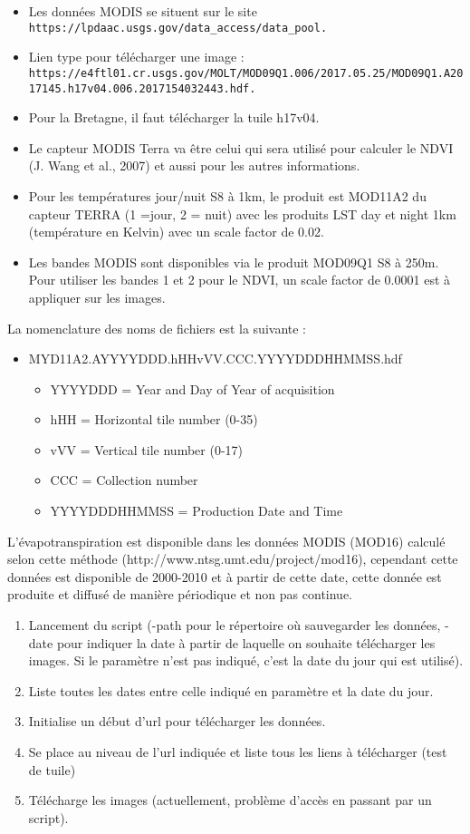 \documentclass[10pt,a4paper]{article}
\begin{document}
\begin{itemize}
\item Les données MODIS se situent sur le site \verb!https://lpdaac.usgs.gov/data_access/data_pool.!
\item Lien type pour télécharger une image : \verb!https://e4ftl01.cr.usgs.gov/MOLT/MOD09Q1.006/2017.05.25/MOD09Q1.A2017145.h17v04.006.2017154032443.hdf.!
\item Pour la Bretagne, il faut télécharger la tuile h17v04. 
\item Le capteur MODIS Terra va être celui qui sera utilisé pour calculer le NDVI (J. Wang et al., 2007) et aussi pour les autres informations.
\item Pour les températures jour/nuit S8 à 1km, le produit est MOD11A2 du capteur TERRA (1 =jour, 2 = nuit) avec les produits LST day et night 1km (température en Kelvin) avec un scale factor de 0.02.
\item Les bandes MODIS sont disponibles via le produit MOD09Q1 S8 à 250m. Pour utiliser les bandes 1 et 2 pour le NDVI, un scale factor de 0.0001 est à appliquer sur les images.
\end{itemize}  

La nomenclature des noms de fichiers est la suivante :
\begin{itemize}
\item MYD11A2.AYYYYDDD.hHHvVV.CCC.YYYYDDDHHMMSS.hdf
\begin{itemize}
\item YYYYDDD = Year and Day of Year of acquisition
\item hHH = Horizontal tile number (0-35)
\item vVV = Vertical tile number (0-17)
\item CCC = Collection number
\item YYYYDDDHHMMSS = Production Date and Time
\end{itemize}
\end{itemize}

L'évapotranspiration est disponible dans les données MODIS (MOD16) calculé selon cette méthode (http://www.ntsg.umt.edu/project/mod16), cependant cette données est disponible de 2000-2010 et à partir de cette date, cette donnée est produite et diffusé de manière périodique et non pas continue.

\begin{enumerate}
\item Lancement du script (-path pour le répertoire où sauvegarder les données, -date pour indiquer la date à partir de laquelle on souhaite télécharger les images. Si le paramètre n'est pas indiqué, c'est la date du jour qui est utilisé).
\item Liste toutes les dates entre celle indiqué en paramètre et la date du jour.
\item Initialise un début d'url pour télécharger les données.
\item Se place au niveau de l'url indiquée et liste tous les liens à télécharger (test de tuile)
\item Télécharge les images (actuellement, problème d’accès en passant par un script).
\end{enumerate}
\end{document}
